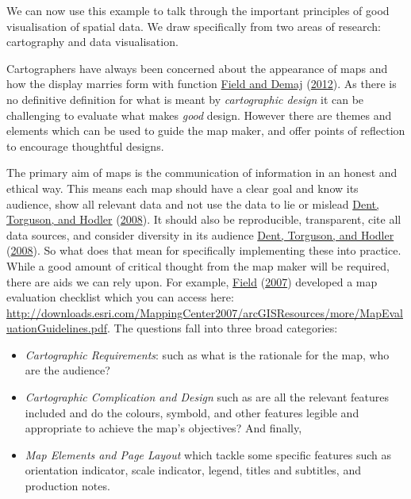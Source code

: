 \documentclass[
  krantz2]{krantz}
\providecommand{\tightlist}{%
  \setlength{\itemsep}{0pt}\setlength{\parskip}{0pt}}
\begin{document}
We can now use this example to talk through the important principles of good visualisation of spatial data. We draw specifically from two areas of research: cartography and data visualisation.

Cartographers have always been concerned about the appearance of maps and how the display marries form with function \protect\hyperlink{ref-Field_2012}{Field and Demaj} (\protect\hyperlink{ref-Field_2012}{2012}). As there is no definitive definition for what is meant by \emph{cartographic design} it can be challenging to evaluate what makes \emph{good} design. However there are themes and elements which can be used to guide the map maker, and offer points of reflection to encourage thoughtful designs.

The primary aim of maps is the communication of information in an honest and ethical way. This means each map should have a clear goal and know its audience, show all relevant data and not use the data to lie or mislead \protect\hyperlink{ref-Dent_2008}{Dent, Torguson, and Hodler} (\protect\hyperlink{ref-Dent_2008}{2008}). It should also be reproducible, transparent, cite all data sources, and consider diversity in its audience \protect\hyperlink{ref-Dent_2008}{Dent, Torguson, and Hodler} (\protect\hyperlink{ref-Dent_2008}{2008}). So what does that mean for specifically implementing these into practice. While a good amount of critical thought from the map maker will be required, there are aids we can rely upon. For example, \protect\hyperlink{ref-Field_2007}{Field} (\protect\hyperlink{ref-Field_2007}{2007}) developed a map evaluation checklist which you can access here: \url{http://downloads.esri.com/MappingCenter2007/arcGISResources/more/MapEvaluationGuidelines.pdf}. The questions fall into three broad categories:

\begin{itemize}
\tightlist
\item
  \emph{Cartographic Requirements}: such as what is the rationale for the map, who are the audience?
\item
  \emph{Cartographic Complication and Design} such as are all the relevant features included and do the colours, symbold, and other features legible and appropriate to achieve the map's objectives? And finally,
\item
  \emph{Map Elements and Page Layout} which tackle some specific features such as orientation indicator, scale indicator, legend, titles and subtitles, and production notes.
\end{itemize}
\end{document}
